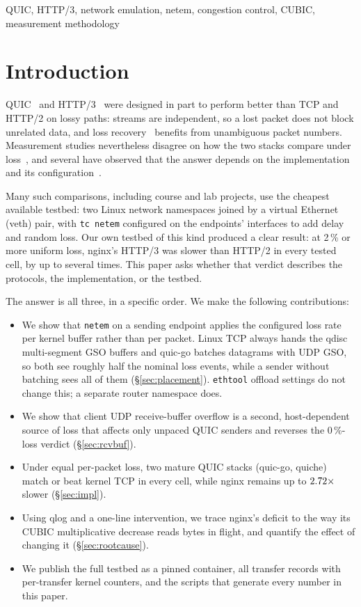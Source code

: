 \documentclass[conference]{IEEEtran}
\newcommand{\hthree}{HTTP/3}
\newcommand{\htwo}{HTTP/2}
\begin{document}
\begin{IEEEkeywords}
QUIC, HTTP/3, network emulation, netem, congestion control, CUBIC, measurement methodology
\end{IEEEkeywords}

\section{Introduction}
QUIC~\cite{rfc9000} and \hthree~\cite{rfc9114} were designed in part to perform better than TCP and \htwo{} on lossy
paths: streams are independent, so a lost packet does not block unrelated data, and loss recovery~\cite{rfc9002} benefits
from unambiguous packet numbers. Measurement studies nevertheless disagree on how the two stacks compare under
loss~\cite{kakhki2017long,wolsing2019performance,yu2021dissecting,megyesi2016quick}, and several have observed that the
answer depends on the implementation and its configuration~\cite{yu2021dissecting,marx2020same,kakhki2017long}.

Many such comparisons, including course and lab projects, use the cheapest available testbed: two Linux network namespaces
joined by a virtual Ethernet (veth) pair, with \texttt{tc netem} configured on the endpoints' interfaces to add delay and
random loss. Our own testbed of this kind produced a clear result: at 2\,\% or more uniform loss, nginx's \hthree{} was
slower than \htwo{} in every tested cell, by up to several times. This paper asks whether that verdict describes the
protocols, the implementation, or the testbed.

The answer is all three, in a specific order. We make the following contributions:
\begin{itemize}
\item We show that \texttt{netem} on a sending endpoint applies the configured loss rate per kernel buffer rather than per
packet. Linux TCP always hands the qdisc multi-segment GSO buffers and quic-go batches datagrams with UDP GSO, so both see
roughly half the nominal loss events, while a sender without batching sees all of them (\S\ref{sec:placement}).
\texttt{ethtool} offload settings do not change this; a separate router namespace does.
\item We show that client UDP receive-buffer overflow is a second, host-dependent source of loss that affects only
unpaced QUIC senders and reverses the 0\,\%-loss verdict (\S\ref{sec:rcvbuf}).
\item Under equal per-packet loss, two mature QUIC stacks (quic-go, quiche) match or beat kernel TCP in every cell, while
nginx remains up to $2.72\times$ slower (\S\ref{sec:impl}).
\item Using qlog and a one-line intervention, we trace nginx's deficit to the way its CUBIC multiplicative decrease reads
bytes in flight, and quantify the effect of changing it (\S\ref{sec:rootcause}).
\item We publish the full testbed as a pinned container, all \TotalTransfers{} transfer records with per-transfer kernel
counters, and the scripts that generate every number in this paper.
\end{itemize}
\end{document}
